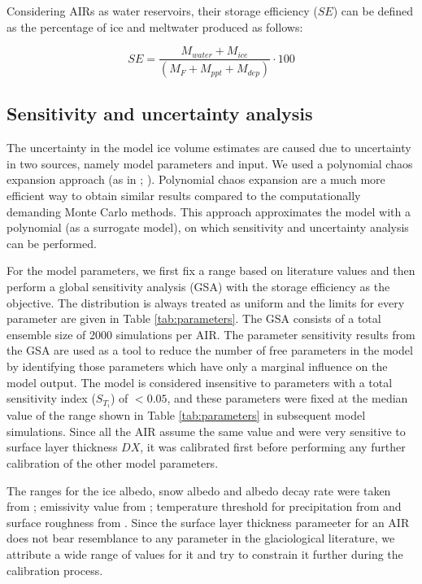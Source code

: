 \documentclass[utf8]{frontiersSCNS} %
\begin{document}
Considering AIRs as water reservoirs, their storage efficiency ($SE$) can be defined as the percentage of ice and
meltwater produced as follows:

\begin{equation} \textit{SE} = \frac{M_{water}+M_{ice}}{(M_F+M_{ppt}+M_{dep})} \cdot 100 \end{equation}


\subsection{Sensitivity and uncertainty analysis}

The uncertainty in the model ice volume estimates are caused due to uncertainty in two sources, namely model parameters
and input. We used a polynomial chaos expansion approach (as in \cite{uncertainpy_2018}; \cite{Xiu_2005}).  Polynomial
chaos expansion are a much more efficient way to obtain similar results compared to the computationally demanding Monte
Carlo methods. This approach approximates the model with a polynomial (as a surrogate model), on which sensitivity and
uncertainty analysis can be performed.

For the model parameters, we first fix a range based on literature values and then perform a global sensitivity analysis
(GSA) with the storage efficiency as the objective. The distribution is always treated as uniform and the limits for
every parameter are given in Table \ref{tab:parameters}. The GSA consists of a total ensemble size of 2000 simulations
per AIR. The parameter sensitivity results from the GSA are used as a tool to reduce the number of free parameters in
the model by identifying those parameters which have only a marginal influence on the model output. The model is
considered insensitive to parameters with a total sensitivity index ($S_{T_{i}}$) of $< 0.05$, and these parameters were
fixed at the median value of the range shown in Table \ref{tab:parameters} in subsequent model simulations. Since all
the AIR assume the same value and were very sensitive to surface layer thickness $DX$, it was calibrated first before
performing any further calibration of the other model parameters.

The ranges for the ice albedo, snow albedo and albedo decay rate were taken from \cite{ZollesMaussion_2019}; emissivity
value from \cite{steiner_2015}; temperature threshold for precipitation from \cite{Zhou_2010} and surface roughness from
\cite{BrockWillisSharp_2006}. Since the surface layer thickness parameeter for an AIR does not bear resemblance to any
parameter in the glaciological literature, we attribute a wide range of values for it and try to constrain it further
during the calibration process.
\end{document}
